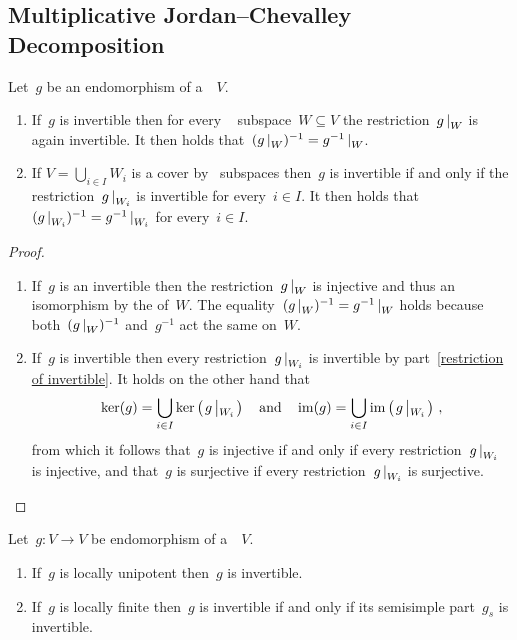 \subsection{Multiplicative Jordan--Chevalley Decomposition}


\begin{lemma}
  \label{invertibility via fd}
  Let~$g$ be an endomorphism of a~{\kvs}~$V$.
  \begin{enumerate}
    \item
      \label{restriction of invertible}
      If~$g$ is invertible then for every {\fd}~ subspace~$W \subseteq V$ the restriction~$\restrict{g}{W}$ is again invertible.
      It then holds that~$(\restrict{g}{W})^{-1} = \restrict{g^{-1}}{W}$.
    \item
      If $V = \bigcup_{i \in I} W_i$ is a cover by~ subspaces then~$g$ is invertible if and only if the restriction~$\restrict{g}{W_i}$ is invertible for every~$i \in I$.
      It then holds that~$( \restrict{g}{W_i} )^{-1} = \restrict{g^{-1}}{W_i}$ for every~$i \in I$.
  \end{enumerate}
\end{lemma}


\begin{proof}
  \leavevmode
  \begin{enumerate}
    \item
      If~$g$ is an invertible then the restriction~$\restrict{g}{W}$ is injective and thus an isomorphism by the  of~$W$.
      The equality~$(\restrict{g}{W})^{-1} = \restrict{g^{-1}}{W}$ holds because both~$(\restrict{g}{W})^{-1}$ and~$g^{-1}$ act the same on~$W$.
    \item
      If~$g$ is invertible then every restriction~$\restrict{g}{W_i}$ is invertible by part~\ref*{restriction of invertible}.
      It holds on the other hand that
      \[
          \ker(g)
        = \bigcup_{i \in I} \ker\left( \restrict*{g}{W_i} \right)
        \quad\text{and}\quad
          \im(g)
        = \bigcup_{i \in I} \im\left( \restrict*{g}{W_i} \right) \,,
      \]
      from which it follows that~$g$ is injective if and only if every restriction~$\restrict{g}{W_i}$ is injective, and that~$g$ is surjective if every restriction~$\restrict{g}{W_i}$ is surjective.
    \qedhere
  \end{enumerate}
\end{proof}


\begin{corollary}
  Let~$g \colon V \to V$ be endomorphism of a~{\kvs}~$V$.
  \begin{enumerate}
    \item
      If~$g$ is locally unipotent then~$g$ is invertible.
    \item
      If~$g$ is locally finite then~$g$ is invertible if and only if its semisimple part~$g_s$ is invertible.
  \end{enumerate}
\end{corollary}


